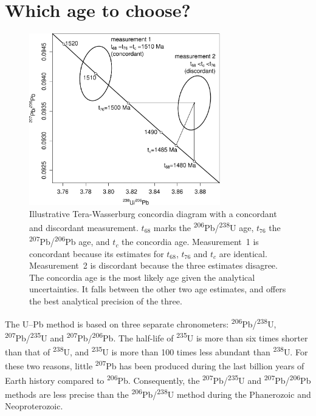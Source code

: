 \documentclass[gchron, manuscript]{copernicus}
\begin{document}
\section{Which age to choose?}\label{sec:whichage}

\begin{figure}[t]
  \includegraphics[width=8.3cm]{TW1500.pdf}
  \caption{Illustrative Tera-Wasserburg concordia diagram with a
      concordant and discordant measurement. $t_{68}$ marks the
      \textsuperscript{206}Pb/\textsuperscript{238}U age, $t_{76}$ the
      \textsuperscript{207}Pb/\textsuperscript{206}Pb age, and $t_{c}$
      the concordia age. Measurement~1 is concordant because its
      estimates for $t_{68}$, $t_{76}$ and $t_{c}$ are
      identical. Measurement~2 is discordant because the three
      estimates disagree. The concordia age is the most likely age
      given the analytical uncertainties. It falls between the other
      two age estimates, and offers the best analytical precision of
      the three.
  }
  \label{fig:concordia}
\end{figure}

The U--Pb method is based on three separate chronometers:
\textsuperscript{206}Pb/\textsuperscript{238}U,
\textsuperscript{207}Pb/\textsuperscript{235}U and
\textsuperscript{207}Pb/\textsuperscript{206}Pb. The half-life of
\textsuperscript{235}U is more than six times shorter than that of
\textsuperscript{238}U, and \textsuperscript{235}U is more than 100
times less abundant than \textsuperscript{238}U. For these two
reasons, little \textsuperscript{207}Pb has been produced during the
last billion years of Earth history compared to
\textsuperscript{206}Pb. Consequently, the
\textsuperscript{207}Pb/\textsuperscript{235}U and
\textsuperscript{207}Pb/\textsuperscript{206}Pb methods are less
precise than the \textsuperscript{206}Pb/\textsuperscript{238}U method
during the Phanerozoic and Neoproterozoic.
\end{document}
